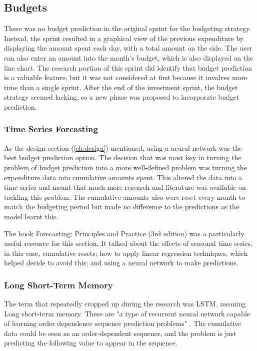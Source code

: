 \subsection{Budgets}
\label{sec:budgets}
There was no budget prediction in the original sprint for the budgeting strategy. Instead, the sprint resulted in a graphical view of the previous expenditure by displaying the amount spent each day, with a total amount on the side. The user can also enter an amount into the month's budget, which is also displayed on the line chart. The research portion of this sprint did identify that budget prediction is a valuable feature, but it was not considered at first because it involves more time than a single sprint. After the end of the investment sprint, the budget strategy seemed lacking, so a new phase was proposed to incorporate budget prediction.

\subsubsection{Time Series Forcasting}
As the design section (\ref{ch:design}) mentioned, using a neural network was the best budget prediction option. The decision that was most key in turning the problem of budget prediction into a more well-defined problem was turning the expenditure data into cumulative amounts spent. This altered the data into a time series and meant that much more research and literature was available on tackling this problem. The cumulative amounts also were reset every month to match the budgeting period but made no difference to the predictions as the model learnt this.

The book Forecasting: Principles and Practice (3rd edition) \cite{ForcastingPrinciplesPractice} was a particularly useful resource for this section. It talked about the effects of seasonal time series, in this case, cumulative resets; how to apply linear regression techniques, which helped decide to avoid this; and using a neural network to make predictions.

\subsubsection{Long Short-Term Memory}
The term that repeatedly cropped up during the research was LSTM, meaning Long short-term memory. These are "a type of recurrent neural network capable of learning order dependence sequence prediction problems" \cite{LSTMGentleIntro}. The cumulative data could be seen as an order-dependent sequence, and the problem is just predicting the following value to appear in the sequence.

